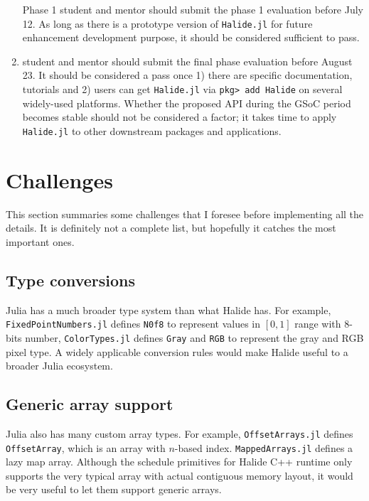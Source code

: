 \documentclass{article}
\begin{document}
\begin{enumerate}
    \item [Phase 1] student and mentor should submit the phase 1 evaluation before July 12. As long as there is a prototype version of \lstinline{Halide.jl} for future enhancement development purpose, it should be considered sufficient to pass.
    \item [Final Phase] student and mentor should submit the final phase evaluation before August 23. It should be considered a pass once 1) there are specific documentation, tutorials and 2) users can get \lstinline{Halide.jl} via \lstinline{pkg> add Halide} on several widely-used platforms. Whether the proposed API during the GSoC period becomes stable should not be considered a factor; it takes time to apply \lstinline{Halide.jl} to other downstream packages and applications.
\end{enumerate}



\section{Challenges}

This section summaries some challenges that I foresee before implementing all the details. It is definitely not a complete list, but hopefully it catches the most important ones.

\subsection{Type conversions}

Julia has a much broader type system than what Halide has. For example, \lstinline{FixedPointNumbers.jl} defines \lstinline{N0f8} to represent values in $[0, 1]$ range with $8$-bits number, \lstinline{ColorTypes.jl} defines \lstinline{Gray} and \lstinline{RGB} to represent the gray and RGB pixel type. A widely applicable conversion rules would make Halide useful to a broader Julia ecosystem.

\subsection{Generic array support}

Julia also has many custom array types. For example, \lstinline{OffsetArrays.jl} defines \lstinline{OffsetArray}, which is an array with $n$-based index. \lstinline{MappedArrays.jl} defines a lazy map array. Although the schedule primitives for Halide C++ runtime only supports the very typical array with actual contiguous memory layout, it would be very useful to let them support generic arrays.
\end{document}
